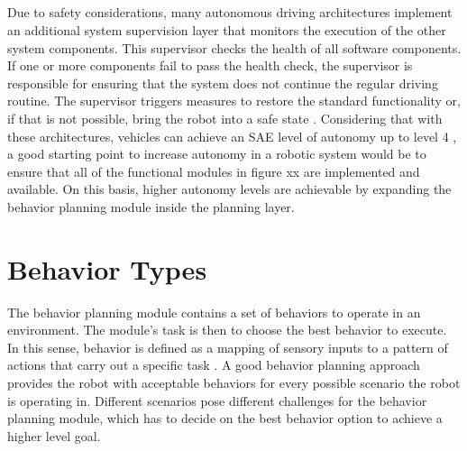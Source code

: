 \subparagraph*{}
Due to safety considerations, many autonomous driving architectures implement an additional system supervision layer that monitors the execution of the other system components. This supervisor checks the health of all software components. If one or more components fail to pass the health check, the supervisor is responsible for ensuring that the system does not continue the regular driving routine. The supervisor triggers measures to restore the standard functionality or, if that is not possible, bring the robot into a safe state \cite{zimmermann2020adaptive}. 
Considering that with these architectures, vehicles can achieve an SAE level of autonomy up to level 4 \cite{bacha2008odin},  a good starting point to increase autonomy in a robotic system would be to ensure that all of the functional modules in figure xx are implemented and available. On this basis, higher autonomy levels are achievable by expanding the behavior planning module inside the planning layer. 


\section{Behavior Types}

The behavior planning module contains a set of behaviors to operate in an environment. The module's task is then to choose the best behavior to execute. In this sense, behavior is defined as a mapping of sensory inputs to a pattern of actions that carry out a specific task \cite{murphy2000}. A good behavior planning approach provides the robot with acceptable behaviors for every possible scenario the robot is operating in. Different scenarios pose different challenges for the behavior planning module, which has to decide on the best behavior option to achieve a higher level goal. 

